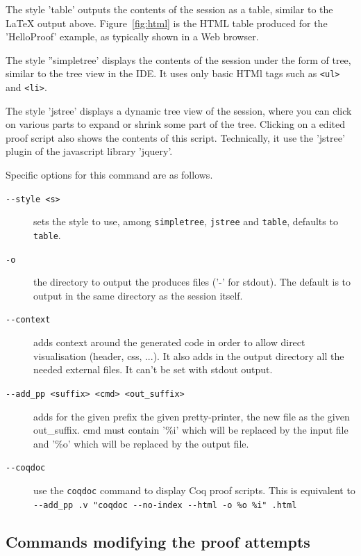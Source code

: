 The style 'table' outputs the contents of the session as a table,
similar to the LaTeX output above. Figure~\ref{fig:html} is the HTML table
produced for the 'HelloProof' example, as typically shown in a Web
browser.

The style ''simpletree' displays the contents of the session under the form of tree, similar to the tree view in the IDE. It uses only basic HTMl tags such as \verb|<ul>| and \verb|<li>|.

The style 'jstree' displays a dynamic tree view of the session, where
you can click on various parts to expand or shrink some part of the
tree. Clicking on a edited proof script also shows the contents of
this script. Technically, it use the 'jstree' plugin of the javascript
library 'jquery'.

Specific options for this command are as follows.
\begin{description}
\item[\texttt{-{}-style <s>}] sets the style to use, among
  \texttt{simpletree}, \texttt{jstree} and \texttt{table}, defaults to
  \texttt{table}.

\item[\texttt{-o}] the directory to output the produces files ('-' for
  stdout). The default is to output in the same directory as the session
  itself.

\item[\texttt{-{}-context}] adds context around the generated code in
  order to allow direct visualisation (header, css, ...). It also adds
  in the output directory all the needed external files. It can't be set with
  stdout output.

\item[\texttt{-{}-add\_pp <suffix> <cmd> <out\_suffix>}] adds for the
  given prefix the given pretty-printer, the new file as the given
  out\_suffix. cmd must contain '\%i' which will be replaced by the
  input file and '\%o' which will be replaced by the output file.

\item[\texttt{-{}-coqdoc}] use the \verb|coqdoc| command to display Coq proof
  scripts. This is equivalent to \texttt{-{}-add\_pp .v "coqdoc
    -{}-no-index -{}-html -o \%o \%i" .html}

\end{description}

\subsection{Commands modifying the proof attempts}

